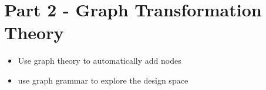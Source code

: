 \documentclass{report}
\begin{document}




\doublespacing
\tableofcontents
\newpage
\listoffigures
\listoftables
\newpage
\singlespacing






%
\chapter{Part 2 - Graph Transformation Theory}
\begin{itemize}
	\item Use graph theory to automatically add nodes
	\item use graph grammar to explore the design space
\end{itemize}

\newpage

 
\end{document}
